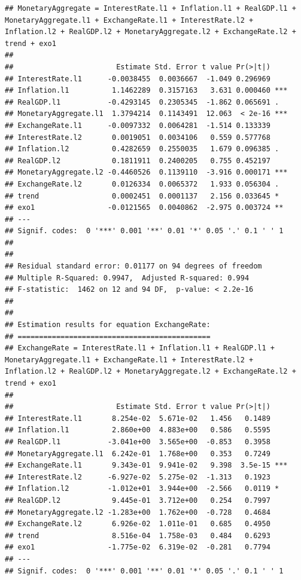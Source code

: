 \documentclass[11pt,preprint, authoryear]{elsarticle}
\numberwithin{equation}{section}
\numberwithin{figure}{section}
\numberwithin{table}{section}
\begin{document}
\begin{verbatim}
## MonetaryAggregate = InterestRate.l1 + Inflation.l1 + RealGDP.l1 + MonetaryAggregate.l1 + ExchangeRate.l1 + InterestRate.l2 + Inflation.l2 + RealGDP.l2 + MonetaryAggregate.l2 + ExchangeRate.l2 + trend + exo1 
## 
##                        Estimate Std. Error t value Pr(>|t|)    
## InterestRate.l1      -0.0038455  0.0036667  -1.049 0.296969    
## Inflation.l1          1.1462289  0.3157163   3.631 0.000460 ***
## RealGDP.l1           -0.4293145  0.2305345  -1.862 0.065691 .  
## MonetaryAggregate.l1  1.3794214  0.1143491  12.063  < 2e-16 ***
## ExchangeRate.l1      -0.0097332  0.0064281  -1.514 0.133339    
## InterestRate.l2       0.0019051  0.0034106   0.559 0.577768    
## Inflation.l2          0.4282659  0.2550035   1.679 0.096385 .  
## RealGDP.l2            0.1811911  0.2400205   0.755 0.452197    
## MonetaryAggregate.l2 -0.4460526  0.1139110  -3.916 0.000171 ***
## ExchangeRate.l2       0.0126334  0.0065372   1.933 0.056304 .  
## trend                 0.0002451  0.0001137   2.156 0.033645 *  
## exo1                 -0.0121565  0.0040862  -2.975 0.003724 ** 
## ---
## Signif. codes:  0 '***' 0.001 '**' 0.01 '*' 0.05 '.' 0.1 ' ' 1
## 
## 
## Residual standard error: 0.01177 on 94 degrees of freedom
## Multiple R-Squared: 0.9947,  Adjusted R-squared: 0.994 
## F-statistic:  1462 on 12 and 94 DF,  p-value: < 2.2e-16 
## 
## 
## Estimation results for equation ExchangeRate: 
## ============================================= 
## ExchangeRate = InterestRate.l1 + Inflation.l1 + RealGDP.l1 + MonetaryAggregate.l1 + ExchangeRate.l1 + InterestRate.l2 + Inflation.l2 + RealGDP.l2 + MonetaryAggregate.l2 + ExchangeRate.l2 + trend + exo1 
## 
##                        Estimate Std. Error t value Pr(>|t|)    
## InterestRate.l1       8.254e-02  5.671e-02   1.456   0.1489    
## Inflation.l1          2.860e+00  4.883e+00   0.586   0.5595    
## RealGDP.l1           -3.041e+00  3.565e+00  -0.853   0.3958    
## MonetaryAggregate.l1  6.242e-01  1.768e+00   0.353   0.7249    
## ExchangeRate.l1       9.343e-01  9.941e-02   9.398  3.5e-15 ***
## InterestRate.l2      -6.927e-02  5.275e-02  -1.313   0.1923    
## Inflation.l2         -1.012e+01  3.944e+00  -2.566   0.0119 *  
## RealGDP.l2            9.445e-01  3.712e+00   0.254   0.7997    
## MonetaryAggregate.l2 -1.283e+00  1.762e+00  -0.728   0.4684    
## ExchangeRate.l2       6.926e-02  1.011e-01   0.685   0.4950    
## trend                 8.516e-04  1.758e-03   0.484   0.6293    
## exo1                 -1.775e-02  6.319e-02  -0.281   0.7794    
## ---
## Signif. codes:  0 '***' 0.001 '**' 0.01 '*' 0.05 '.' 0.1 ' ' 1

\end{verbatim}
\end{document}
